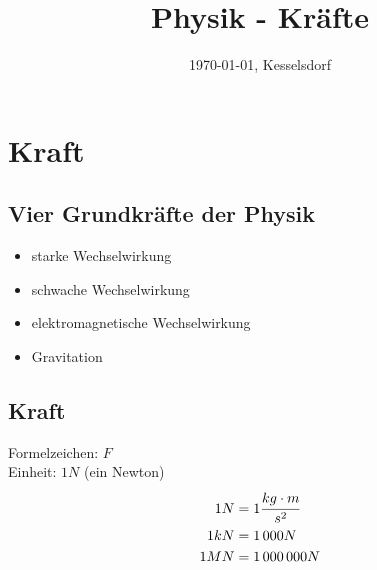 \documentclass{report}
\title{Physik - Kräfte}
\date{\today{}, Kesselsdorf}
\begin{document}

    \section*{Kraft}
    \label{Kraft}
    \subsection*{Vier Grundkräfte der Physik}
        \begin{itemize}
            \item starke Wechselwirkung
            \item schwache Wechselwirkung
            \item elektromagnetische Wechselwirkung
            \item Gravitation
        \end{itemize}
    \subsection*{Kraft}
        Formelzeichen:   $ F $ \\
        Einheit:         $ 1 N $ (ein Newton)
        \begin{equation*}
        \begin{aligned}
            1 N &= 1 \cfrac{kg \cdot m}{s^2} \\
            1 kN &= 1\,000 N \\
            1 MN &= 1\,000\,000 N \\
        \end{aligned}
      \end{equation*}
\end{document}
